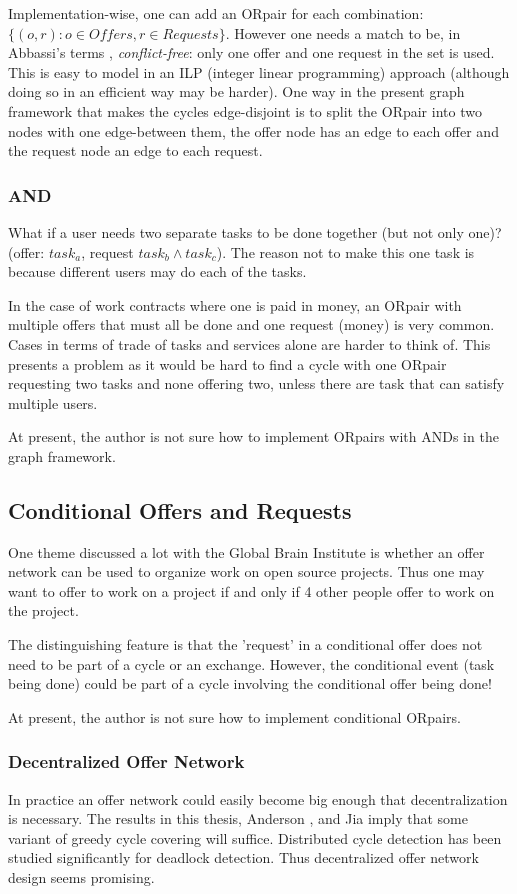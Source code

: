 \documentclass[main.tex]{subfiles}
\begin{document}
Implementation-wise, one can add an ORpair for each combination: $\{(o,r) : o \in Offers,r \in Requests\}$. However one needs a match to be, in Abbassi's terms \cite{Abb1}, \textit{conflict-free}: only one offer and one request in the set is used. This is easy to model in an ILP (integer linear programming) approach (although doing so in an efficient way may be harder). One way in the present graph framework that makes the cycles edge-disjoint is to split the ORpair into two nodes with one edge-between them, the offer node has an edge to each offer and the request node an edge to each request.

\subsubsection{AND}
What if a user needs two separate tasks to be done together (but not only one)? (offer: $task_a$, request $task_b \wedge task_c$). The reason not to make this one task is because different users may do each of the tasks.

In the case of work contracts where one is paid in money, an ORpair with multiple offers that must all be done and one request (money) is very common. Cases in terms of trade of tasks and services alone are harder to think of. This presents a problem as it would be hard to find a cycle with one ORpair requesting two tasks and none offering two, unless there are task that can satisfy multiple users.

At present, the author is not sure how to implement ORpairs with ANDs in the graph framework.

\subsection{Conditional Offers and Requests}
One theme discussed a lot with the Global Brain Institute is whether an offer network can be used to organize work on open source projects. Thus one may want to offer to work on a project if and only if 4 other people offer to work on the project.

The distinguishing feature is that the 'request' in a conditional offer does not need to be part of a cycle or an exchange. However, the conditional event (task being done) could be part of a cycle involving the conditional offer being done!

At present, the author is not sure how to implement conditional ORpairs.

\subsubsection{Decentralized Offer Network}
In practice an offer network could easily become big enough that decentralization is necessary. The results in this thesis, Anderson \cite{And1}, and Jia \cite{Jia1} imply that some variant of greedy cycle covering will suffice. Distributed cycle detection has been studied significantly for deadlock detection. Thus decentralized offer network design seems promising.
\end{document}

